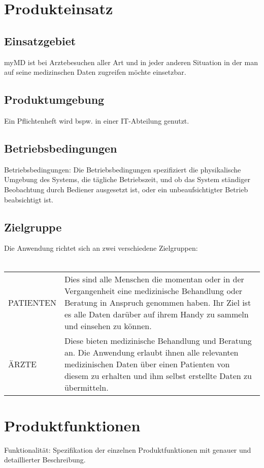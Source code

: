 \documentclass[a4paper]{scrreprt}
\begin{document}
\chapter{Produkteinsatz}

\section{Einsatzgebiet}
myMD ist bei Arztebesuchen aller Art und in jeder anderen Situation in der man auf seine medizinschen Daten zugreifen möchte einsetzbar.

\section{Produktumgebung}
Ein Pflichtenheft wird bspw. in einer IT-Abteilung genutzt.

\section{Betriebsbedingungen}
Betriebsbedingungen: Die Betriebsbedingungen spezifiziert die physikalische
Umgebung des Systems, die tägliche Betriebszeit, und ob das System ständiger
Beobachtung durch Bediener ausgesetzt ist, oder ein unbeaufsichtigter Betrieb
beabsichtigt ist.
 
 
\section{Zielgruppe}
Die Anwendung richtet sich an zwei verschiedene Zielgruppen:  \\\\
\begin{tabular}{lll}
PATIENTEN &  \multicolumn{2}{p{12cm}}{Dies sind alle Menschen die momentan oder in der Vergangenheit eine medizinische Behandlung oder Beratung in Anspruch genommen haben. Ihr Ziel ist es alle Daten darüber auf ihrem Handy zu sammeln und einsehen zu können.}\\
ÄRZTE &  \multicolumn{2}{p{12cm}}{Diese bieten medizinische Behandlung und Beratung an. Die Anwendung erlaubt ihnen alle relevanten medizinischen Daten über einen Patienten von diesem zu erhalten und ihm selbst erstellte Daten zu übermitteln.}  \\
\end{tabular}

\chapter{Produktfunktionen}
Funktionalität: Spezifikation der einzelnen Produktfunktionen mit genauer und detaillierter Beschreibung.
\end{document}
